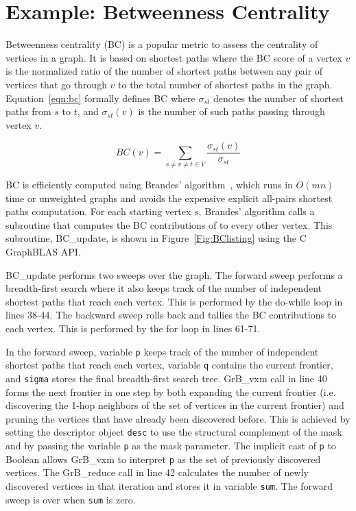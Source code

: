 \section{Example: Betweenness Centrality}

\label{sec:example}
Betweenness centrality (BC) is a popular metric to assess the centrality of vertices in a graph. It is based on shortest paths where the BC score
of a vertex $v$ is the normalized ratio of the number of shortest paths between any pair of vertices that go through $v$ to the total number of shortest paths in the graph. 
Equation~\ref{eqn:bc} formally defines BC where $\sigma_{st}$ denotes the number of shortest paths from $s$ to $t$, and $\sigma_{st}(v)$ is the number of such paths 
passing through vertex $v$.

\begin{equation}
	BC(v) = \sum_{s \neq v \neq t \in V} \frac{\sigma_{st}(v)}{\sigma_{st}}
\label{eqn:bc}
\end{equation}

BC is efficiently computed using Brandes' algorithm~\cite{brandes2001faster}, which runs in $O(mn)$ time or unweighted graphs and avoids the expensive explicit all-pairs shortest paths computation.
For each starting vertex $s$, Brandes' algorithm calls a subroutine that computes the BC contributions of to every other vertex. This subroutine, BC\_update, is
shown in Figure~\ref{Fig:BClisting} using the C GraphBLAS API. 

BC\_update performs two sweeps over the graph. The forward sweep performs a breadth-first search where it also keeps track of the number
of independent shortest paths that reach each vertex. This is performed by the do-while loop in lines 38-44. 
The backward sweep rolls back and tallies the BC contributions to each vertex. This is performed by the for loop in lines 61-71. 


\begin{figure*}[h]
\caption{C function using GraphBLAS primitives that computes the BC-metric updates ${\it delta}$, given Boolean $n \times n$ adjacency matrix $A$, a set of source vertices $s$, 
and the number of source vertices (i.e. the length of s) ${\it nsver}$.
}
\label{Fig:BClisting}
{\scriptsize

}
\end{figure*}

In the forward sweep, variable {\tt p} keeps track of the number of independent shortest paths that reach each vertex, variable {\tt q} contains the current frontier, and {\tt sigma} stores
the final breadth-first search tree. 
GrB\_vxm call in line 40 forms the next frontier in one step by both expanding the current frontier (i.e. discovering the 1-hop neighbors of the set of vertices in the current frontier) and pruning the vertices that have 
already been discovered before. This is achieved by setting the descriptor object {\tt desc} to use the structural complement of the mask and by passing the 
variable {\tt p} as the mask parameter. The implicit cast of {\tt p} to Boolean allows GrB\_vxm to interpret {\tt p} as the set of previously discovered vertices.
The GrB\_reduce call in line 42 calculates the number of newly discovered vertices in that iteration and stores it in variable {\tt sum}. The forward sweep is over when {\tt sum} is zero.